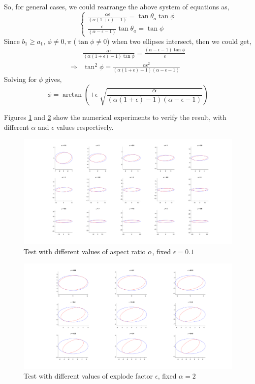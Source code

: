 \documentclass{article}
\begin{document}
So, for general cases, we could rearrange the above system of equations as,
\begin{equation}
\left\{
\begin{aligned}
\frac{\alpha \epsilon}{(\alpha(1+\epsilon)-1)} = \tan\theta_a \tan\phi \\
\frac{\epsilon}{(\alpha - \epsilon - 1)} \tan\theta_a = \tan\phi
\end{aligned}
\right.
\end{equation}
Since $b_1 \geq a_1$, $\phi \neq 0, \pi$ ($\tan\phi \neq 0$) when two ellipses intersect, then we could get,
\begin{equation}
\begin{aligned}
& \frac{\alpha \epsilon}{(\alpha(1+\epsilon)-1) \tan\phi} = \frac{(\alpha - \epsilon - 1) \tan\phi}{\epsilon}\\
\Rightarrow & \tan^2\phi = \frac{\alpha \epsilon^2}{(\alpha(1+\epsilon)-1)(\alpha - \epsilon - 1)}
\end{aligned}
\end{equation}
Solving for $\phi$ gives,
\begin{equation}
\phi = \arctan (\pm \epsilon \sqrt[]{\frac{\alpha}{(\alpha(1+\epsilon)-1)(\alpha - \epsilon - 1)}})
\end{equation}

Figures \ref{diff-alpha} and \ref{diff-epi} show the numerical experiments to verify the result, with different $\alpha$ and $\epsilon$ values respectively.

\begin{figure}
\includegraphics[scale = 0.17]{fig/closed-form_maxAngle-test_alpha.png}
\caption{Test with different values of aspect ratio $\alpha$, fixed $\epsilon = 0.1$}
\label{diff-alpha}
\end{figure}
	
\begin{figure}
\includegraphics[scale = 0.17]{fig/closed-form_maxAngle-test_epsilon.png}
\caption{Test with different values of explode factor $\epsilon$, fixed $\alpha = 2$}
\label{diff-epi}
\end{figure}
\end{document}
